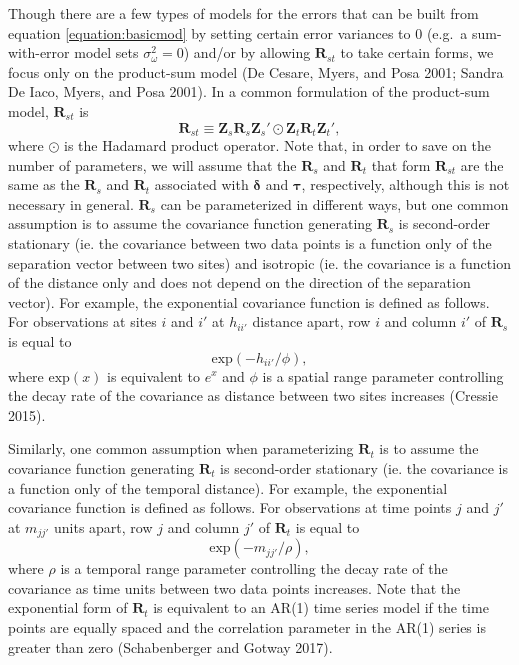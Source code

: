 \documentclass[]{article}    %
\begin{document}
Though there are a few types of models for the errors that can be built
from equation \ref{equation:basicmod} by setting certain error variances
to 0 (e.g.~a sum-with-error model sets \(\sigma^2_{\omega} = 0\)) and/or
by allowing \(\mathbf{R}_{st}\) to take certain forms, we focus only on
the product-sum model (De Cesare, Myers, and Posa 2001; Sandra De Iaco,
Myers, and Posa 2001). In a common formulation of the product-sum model,
\(\mathbf{R}_{st}\) is \mbox{} \begin{equation*}
\mathbf{R}_{st} \equiv \mathbf{Z}_{s} \mathbf{R}_{s} \mathbf{Z}_{s}' \odot \mathbf{Z}_t \mathbf{R}_t \mathbf{Z}_t',
\end{equation*} \noindent where \(\odot\) is the Hadamard product
operator. Note that, in order to save on the number of parameters, we
will assume that the \(\mathbf{R}_s\) and \(\mathbf{R}_t\) that form
\(\mathbf{R}_{st}\) are the same as the \(\mathbf{R}_s\) and
\(\mathbf{R}_t\) associated with \(\bm{\delta}\) and \(\bm{\tau}\),
respectively, although this is not necessary in general.
\(\mathbf{R}_s\) can be parameterized in different ways, but one common
assumption is to assume the covariance function generating
\(\mathbf{R}_s\) is second-order stationary (ie. the covariance between
two data points is a function only of the separation vector between two
sites) and isotropic (ie. the covariance is a function of the distance
only and does not depend on the direction of the separation vector). For
example, the exponential covariance function is defined as follows. For
observations at sites \(i\) and \(i'\) at \(h_{ii'}\) distance apart,
row \(i\) and column \(i'\) of \(\mathbf{R}_{s}\) is equal to \mbox{}
\begin{equation}
\label{equation:spatcov}
\text{exp}(-h_{ii'} / \phi),
\end{equation} \noindent where \(\text{exp}(x)\) is equivalent to
\(e^x\) and \(\phi\) is a spatial range parameter controlling the decay
rate of the covariance as distance between two sites increases (Cressie
2015).

Similarly, one common assumption when parameterizing \(\mathbf{R}_t\) is
to assume the covariance function generating \(\mathbf{R}_t\) is
second-order stationary (ie. the covariance is a function only of the
temporal distance). For example, the exponential covariance function is
defined as follows. For observations at time points \(j\) and \(j'\) at
\(m_{jj'}\) units apart, row \(j\) and column \(j'\) of
\(\mathbf{R}_{t}\) is equal to \mbox{} \begin{equation}
\label{equation:tempcov}
\text{exp}(-m_{jj'} / \rho),
\end{equation} \noindent where \(\rho\) is a temporal range parameter
controlling the decay rate of the covariance as time units between two
data points increases. Note that the exponential form of
\(\mathbf{R}_t\) is equivalent to an AR(1) time series model if the time
points are equally spaced and the correlation parameter in the AR(1)
series is greater than zero (Schabenberger and Gotway 2017).
\end{document}
